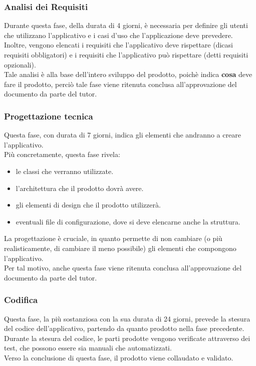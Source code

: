 \subsubsection{Analisi dei Requisiti}
Durante questa fase, della durata di 4 giorni, è necessaria per definire gli utenti che utilizzano l'applicativo e i casi d'uso che l'applicazione deve prevedere.\\
Inoltre, vengono elencati i requisiti che l'applicativo deve rispettare (dicasi requisiti obbligatori) e i requisiti che l'applicativo può rispettare (detti requisiti opzionali).\\
Tale analisi è alla base dell'intero sviluppo del prodotto, poichè indica \textbf{cosa} deve fare il prodotto, perciò tale fase viene ritenuta conclusa all'approvazione del documento da parte del tutor.
\subsubsection{Progettazione tecnica}
Questa fase, con durata di 7 giorni, indica gli elementi che andranno a creare l'applicativo.\\
Più concretamente, questa fase rivela:
\begin{itemize}
    \item le classi che verranno utilizzate.
    \item l'architettura che il prodotto dovrà avere.
    \item gli elementi di design che il prodotto utilizzerà.
    \item eventuali file di configurazione, dove si deve elencarne anche la struttura.
\end{itemize}
La progettazione è cruciale, in quanto permette di non cambiare (o più realisticamente, di cambiare il meno possibile) gli elementi che compongono l'applicativo.\\
Per tal motivo, anche questa fase viene ritenuta conclusa all'approvazione del documento da parte del tutor.
\subsubsection{Codifica}
Questa fase, la più sostanziosa con la sua durata di 24 giorni, prevede la stesura del codice dell'applicativo, partendo da quanto prodotto nella fase precedente.\\
Durante la stesura del codice, le parti prodotte vengono verificate attraverso dei test, che possono essere sia manuali che automatizzati.\\
Verso la conclusione di questa fase, il prodotto viene collaudato e validato.
